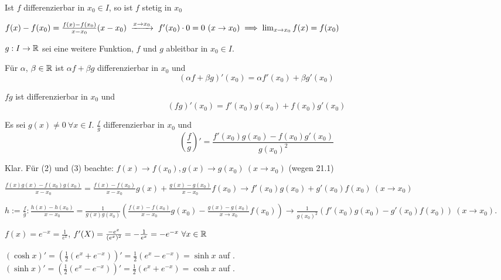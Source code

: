 \documentclass[a4paper,twoside,DIV15,BCOR12mm]{scrbook}
\begin{document}
\begin{satz}
Ist $f$ differenzierbar in $x_0\in I$, so ist $f$ stetig in $x_0$
\end{satz}

\begin{beweis}
$f(x)-f(x_0) = \frac{f(x)-f(x_0)}{x-x_0}(x-x_0) \towegen{x\to x_0} f'(x_0)\cdot 0 = 0 \ (x\to x_0) \folgt \lim_{x\to x_0}f(x) = f(x_0)$
\end{beweis}

\begin{satz}[Ableitungsregeln]
$g:I\to\mathbb{R}$ sei eine weitere Funktion, $f$ und $g$ ableitbar in $x_0 \in I$.
\begin{liste}
\item Für $\alpha$, $\beta \in \mathbb{R}$ ist $\alpha f + \beta g$ differenzierbar in $x_0$ und $$(\alpha f+ \beta g)'(x_0) = \alpha f'(x_0) + \beta g'(x_0)$$
\item $fg$ ist differenzierbar in $x_0$ und $$(fg)'(x_0) = f'(x_0)g(x_0)+f(x_0)g'(x_0)$$
\item Es sei $g(x) \ne 0 \ \forall x\in I$. $\frac{f}{g}$ differenzierbar in $x_0$ und $$(\frac{f}{g})'=\frac{f'(x_0)g(x_0) - f(x_0)g'(x_0)}{g(x_0)^2}$$
\end{liste}
\end{satz}

\begin{beweis}
\begin{liste}
\item Klar. Für (2) und (3) beachte: $f(x)\to f(x_0), g(x)\to g(x_0)\ (x\to x_0)$ (wegen 21.1)
\item $\frac{f(x)g(x)-f(x_0)g(x_0)}{x-x_0} = \frac{f(x) -f(x_0)}{x-x_0}g(x) + \frac{g(x)-g(x_0)}{x-x_0}f(x_0) \to f'(x_0)g(x_0) + g'(x_0)f(x_0) \ (x\to x_0)$
\item $h:=\frac{f}{g}: \frac{h(x)-h(x_0)}{x-x_0}=\frac{1}{g(x)g(x_0)}\left(\frac{f(x)-f(x_0)}{x-x_0}g(x_0) - \frac{g(x)-g(x_0)}{x\to x_0}f(x_0)\right) \to \frac{1}{g(x_0)^2}(f'(x_0)g(x_0) - g'(x_0)f(x_0)) \ (x\to x_0)$.
\end{liste}
\end{beweis}

\begin{beispiele}
\item $f(x) = e^{-x} = \frac{1}{e^x}$, $f'(X) = \frac{-e^x}{(e^x)^2} = -\frac{1}{e^x} = -e^{-x} \ \forall x\in\mathbb{R}$
\item $(\cosh x)' = (\frac{1}{2}(e^x+e^{-x}))' = \frac{1}{2}(e^x-e^{-x}) = \sinh x$ auf \MdR.\\
 $(\sinh x)' = (\frac{1}{2}(e^x-e^{-x}))' = \frac{1}{2}(e^x+e^{-x}) = \cosh x$ auf \MdR.
\end{beispiele}
\end{document}
